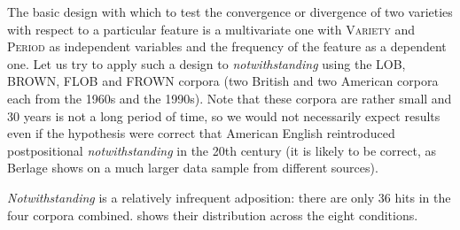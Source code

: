 The basic design  with which to test the convergence or divergence of two varieties  with respect to a particular feature is a multivariate  one with \textsc{Variety}  and \textsc{Period} as independent variables and the frequency  of the feature as a dependent one. Let us try to apply such a design to \textit{notwithstanding} using the LOB,  BROWN,  FLOB  and FROWN  corpora (two British  and two American  corpora each from the 1960s and the 1990s). Note that these corpora are rather small and 30 years is not a long period of time, so we would not necessarily expect results even if the hypothesis were correct that American  English reintroduced postpositional  \textit{notwithstanding} in the 20th century (it is likely to be correct, as Berlage shows on a much larger  data sample from different sources).

\textit{Notwithstanding} is a relatively infrequent adposition:  there are only 36 hits in the four corpora combined.  shows their distribution  across the eight conditions.

